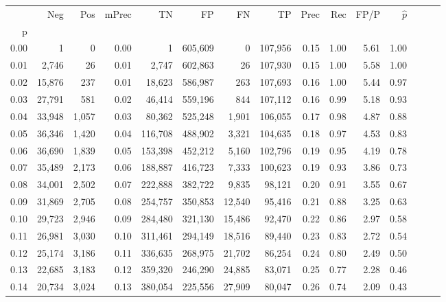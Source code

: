 \begin{tabular}{rrrrrrrrrrrrrrr}
\toprule
{} &     Neg &    Pos & mPrec &       TN &       FP &       FN &       TP &  Prec &   Rec &  FP/P & $\hat{p}$ \\
p    &         &        &       &          &          &          &          &       &       &       &           \\
\midrule
0.00 &       1 &      0 &  0.00 &        1 &  605,609 &        0 &  107,956 &  0.15 &  1.00 &  5.61 &      1.00 \\
0.01 &   2,746 &     26 &  0.01 &    2,747 &  602,863 &       26 &  107,930 &  0.15 &  1.00 &  5.58 &      1.00 \\
0.02 &  15,876 &    237 &  0.01 &   18,623 &  586,987 &      263 &  107,693 &  0.16 &  1.00 &  5.44 &      0.97 \\
0.03 &  27,791 &    581 &  0.02 &   46,414 &  559,196 &      844 &  107,112 &  0.16 &  0.99 &  5.18 &      0.93 \\
0.04 &  33,948 &  1,057 &  0.03 &   80,362 &  525,248 &    1,901 &  106,055 &  0.17 &  0.98 &  4.87 &      0.88 \\
0.05 &  36,346 &  1,420 &  0.04 &  116,708 &  488,902 &    3,321 &  104,635 &  0.18 &  0.97 &  4.53 &      0.83 \\
0.06 &  36,690 &  1,839 &  0.05 &  153,398 &  452,212 &    5,160 &  102,796 &  0.19 &  0.95 &  4.19 &      0.78 \\
0.07 &  35,489 &  2,173 &  0.06 &  188,887 &  416,723 &    7,333 &  100,623 &  0.19 &  0.93 &  3.86 &      0.73 \\
0.08 &  34,001 &  2,502 &  0.07 &  222,888 &  382,722 &    9,835 &   98,121 &  0.20 &  0.91 &  3.55 &      0.67 \\
0.09 &  31,869 &  2,705 &  0.08 &  254,757 &  350,853 &   12,540 &   95,416 &  0.21 &  0.88 &  3.25 &      0.63 \\
0.10 &  29,723 &  2,946 &  0.09 &  284,480 &  321,130 &   15,486 &   92,470 &  0.22 &  0.86 &  2.97 &      0.58 \\
0.11 &  26,981 &  3,030 &  0.10 &  311,461 &  294,149 &   18,516 &   89,440 &  0.23 &  0.83 &  2.72 &      0.54 \\
0.12 &  25,174 &  3,186 &  0.11 &  336,635 &  268,975 &   21,702 &   86,254 &  0.24 &  0.80 &  2.49 &      0.50 \\
0.13 &  22,685 &  3,183 &  0.12 &  359,320 &  246,290 &   24,885 &   83,071 &  0.25 &  0.77 &  2.28 &      0.46 \\
0.14 &  20,734 &  3,024 &  0.13 &  380,054 &  225,556 &   27,909 &   80,047 &  0.26 &  0.74 &  2.09 &      0.43 \\

\end{tabular}
